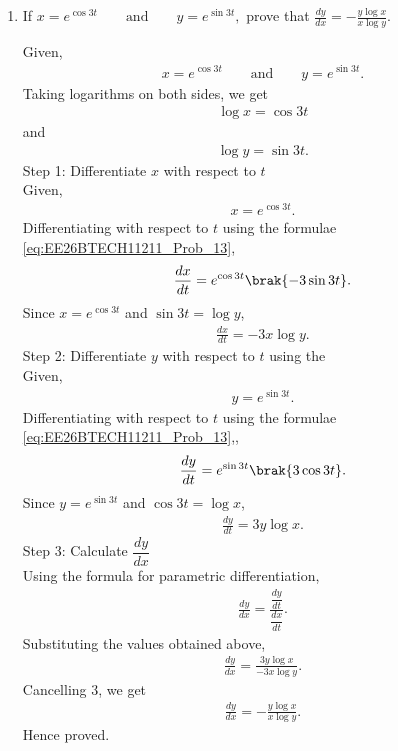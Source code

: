 \begin{enumerate}[label=\thesubsection.\arabic*, ref=\thesubsection.\theenumi]
\begin{figure}[ht]
\end{figure}

\item
If
$
x=e^{\cos 3t}
\qquad \text{and} \qquad
y=e^{\sin 3t},
$
prove that
$
\frac{dy}{dx}
=-\frac{y\log x}{x\log y}.
$

\solution
Given,
\begin{align}
x=e^{\cos 3t}
 \qquad \text{and} \qquad
y=e^{\sin 3t}.
\end{align}
Taking logarithms on both sides, we get
\begin{align}
\log x=\cos 3t
\end{align}
and
\begin{align}
\log y=\sin 3t.
\end{align}
{Step 1: Differentiate $x$ with respect to $t$}
\\Given,
\begin{align}
x=e^{\cos 3t}.
\end{align}
Differentiating with respect to $t$ using the formulae \eqref{eq:EE26BTECH11211_Prob_13},
\begin{align}
\frac{dx}{dt}
=e^{\cos 3t}\brak{-3\sin 3t}.
\end{align}
Since $x=e^{\cos 3t}$ and $\sin 3t=\log y$,
\begin{align}
\frac{dx}{dt}=-3x\log y.
\end{align}
{Step 2: Differentiate $y$ with respect to $t$ using the }
\\Given,
\begin{align}
y=e^{\sin 3t}.
\end{align}
Differentiating with respect to $t$ using the formulae \eqref{eq:EE26BTECH11211_Prob_13},,
\begin{align}
\frac{dy}{dt}
=e^{\sin 3t}\brak{3\cos 3t}.
\end{align}
Since $y=e^{\sin 3t}$ and $\cos 3t=\log x$,
\begin{align}
\frac{dy}{dt}=3y\log x.
\end{align}
{Step 3: Calculate $\dfrac{dy}{dx}$}
\\Using the formula for parametric differentiation,
\begin{align}
\frac{dy}{dx}
=\frac{\dfrac{dy}{dt}}{\dfrac{dx}{dt}}.
\end{align}
Substituting the values obtained above,
\begin{align}
\frac{dy}{dx}
=\frac{3y\log x}{-3x\log y}.
\end{align}
Cancelling $3$, we get
\begin{align}
\frac{dy}{dx}
=-\frac{y\log x}{x\log y}.
\end{align}
Hence proved.


\end{enumerate}

